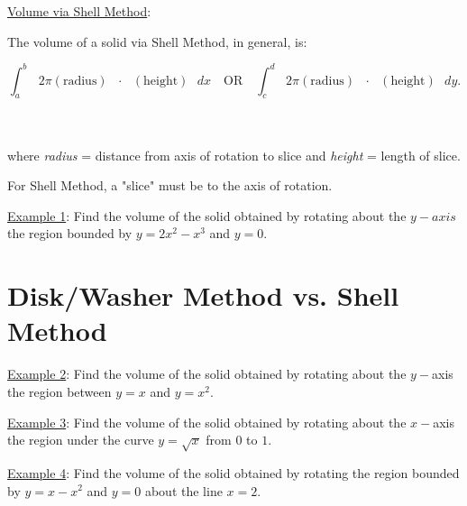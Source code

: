 \documentclass[paper=a4, fontsize=11pt]{scrartcl} %
\numberwithin{equation}{section} %
\numberwithin{figure}{section} %
\numberwithin{table}{section} %
\newcommand{\ds}{\displaystyle}
\begin{document}

\underline{Volume via Shell Method}:

The volume of a solid via Shell Method, in general, is:

\[\ds\int_a^b \text{ } 2\pi  (\text{radius}) \text{ } \cdot \text{ }(\text{height}) \text{ } dx \quad \text{OR} \quad \ds\int_c^d \text{ }2\pi (\text{radius}) \text{ } \cdot \text{ } (\text{height})\text{ } dy.\]
\indent\\
\indent\\
\indent

where \textit{radius} = distance from axis of rotation to slice and \textit{height} = length of slice.\\
\indent

For Shell Method, a "slice" must be \underline{\hspace{1.15in}} to the axis of rotation.\\
\indent


   
\newpage

\underline{Example 1}: Find the volume of the solid obtained by rotating about the $y-axis$ the region bounded by $y=2x^2 - x^3$ and $y=0$.


\vspace{4.25in}

\section*{Disk/Washer Method vs. Shell Method}

\underline{Example 2}: Find the volume of the solid obtained by rotating about the $y-$axis the region between $y=x$ and $y=x^2$.


\newpage

\underline{Example 3}: Find the volume of the solid obtained by rotating about the $x-$axis the region under the curve $y=\sqrt{x}$ from $0$ to $1$.\\
\indent

\vspace{4.25in}


\underline{Example 4}: Find the volume of the solid obtained by rotating the region bounded by $y=x-x^2$ and $y=0$ about the line $x=2$.\\
\indent\\

\end{document}
